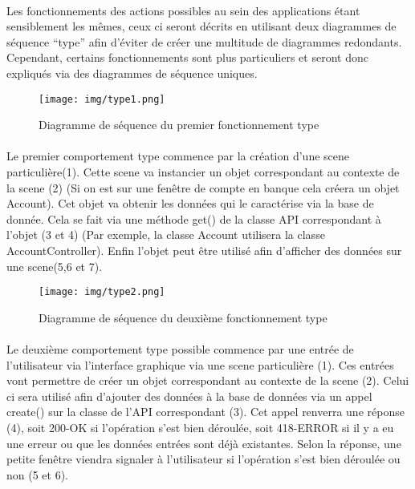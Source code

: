 \paragraph{}Les fonctionnements des actions possibles au sein des applications étant sensiblement les mêmes, ceux ci seront décrits en utilisant deux diagrammes de séquence “type” afin d’éviter de créer une multitude de diagrammes redondants. Cependant, certains fonctionnements sont plus particuliers et seront donc expliqués via des diagrammes de séquence uniques.

    \begin{figure}[ht]
        \centering
        \texttt{[image: img/type1.png]}
        \caption{Diagramme de séquence du premier fonctionnement type}
        \label{fig1}
        \end{figure}

    \paragraph{}Le premier comportement type commence par la création d’une scene particulière(1). Cette scene va instancier un objet correspondant au contexte de la scene (2) (Si on est sur une fenêtre de compte en banque cela créera un objet Account). Cet objet va obtenir les données qui le caractérise via la base de donnée. Cela se fait via une méthode get() de la classe API correspondant à l’objet (3 et 4) (Par exemple, la classe Account utilisera la classe AccountController). Enfin l’objet peut être utilisé afin d’afficher des données sur une scene(5,6 et 7).

    \newpage

    \begin{figure}[ht]
        \centering
        \texttt{[image: img/type2.png]}
        \caption{Diagramme de séquence du deuxième fonctionnement type}
        \label{fig2}
        \end{figure}

    \paragraph{}Le deuxième comportement type possible commence par une entrée de l’utilisateur via l’interface graphique via une scene particulière (1). Ces entrées vont permettre de créer un objet correspondant au contexte de la scene (2). Celui ci sera utilisé afin d’ajouter des données à la base de données via un appel create() sur la classe de l’API correspondant (3). Cet appel renverra une réponse (4), soit 200-OK si l’opération s’est bien déroulée, soit 418-ERROR si il y a eu une erreur ou que les données entrées sont déjà existantes. Selon la réponse, une petite fenêtre viendra signaler à l’utilisateur si l’opération s’est bien déroulée ou non (5 et 6).


